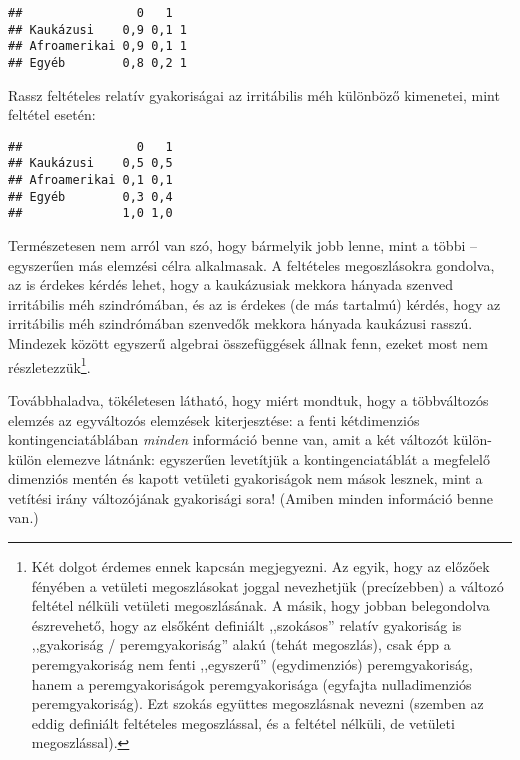\documentclass[]{book}
\newenvironment{Shaded}{\begin{snugshade}}{\end{snugshade}}
\newcommand{\KeywordTok}[1]{\textcolor[rgb]{0.13,0.29,0.53}{\textbf{#1}}}
\newcommand{\DecValTok}[1]{\textcolor[rgb]{0.00,0.00,0.81}{#1}}
\newcommand{\StringTok}[1]{\textcolor[rgb]{0.31,0.60,0.02}{#1}}
\newcommand{\OperatorTok}[1]{\textcolor[rgb]{0.81,0.36,0.00}{\textbf{#1}}}
\newcommand{\NormalTok}[1]{#1}
\let\rmarkdownfootnote\footnote%
\def\footnote{\protect\rmarkdownfootnote}
\begin{document}
\begin{verbatim}
##                0   1  
## Kaukázusi    0,9 0,1 1
## Afroamerikai 0,9 0,1 1
## Egyéb        0,8 0,2 1
\end{verbatim}

Rassz feltételes relatív gyakoriságai az irritábilis méh különböző
kimenetei, mint feltétel esetén:

\begin{Shaded}
\end{Shaded}

\begin{verbatim}
##                0   1
## Kaukázusi    0,5 0,5
## Afroamerikai 0,1 0,1
## Egyéb        0,3 0,4
##              1,0 1,0
\end{verbatim}

Természetesen nem arról van szó, hogy bármelyik jobb lenne, mint a többi
-- egyszerűen más elemzési célra alkalmasak. A feltételes megoszlásokra
gondolva, az is érdekes kérdés lehet, hogy a kaukázusiak mekkora hányada
szenved irritábilis méh szindrómában, és az is érdekes (de más tartalmú)
kérdés, hogy az irritábilis méh szindrómában szenvedők mekkora hányada
kaukázusi rasszú. Mindezek között egyszerű algebrai összefüggések állnak
fenn, ezeket most nem
részletezzük\footnote{Két dolgot érdemes ennek kapcsán megjegyezni. Az egyik, hogy az előzőek fényében a vetületi megoszlásokat joggal nevezhetjük (precízebben) a változó feltétel nélküli vetületi megoszlásának. A másik, hogy jobban belegondolva észrevehető, hogy az elsőként definiált ,,szokásos'' relatív gyakoriság is ,,gyakoriság / peremgyakoriság'' alakú (tehát megoszlás), csak épp a peremgyakoriság nem fenti ,,egyszerű'' (egydimenziós) peremgyakoriság, hanem a peremgyakoriságok peremgyakorisága (egyfajta nulladimenziós peremgyakoriság). Ezt szokás együttes megoszlásnak nevezni (szemben az eddig definiált feltételes megoszlással, és a feltétel nélküli, de vetületi megoszlással).}.

Továbbhaladva, tökéletesen látható, hogy miért mondtuk, hogy a
többváltozós elemzés az egyváltozós elemzések kiterjesztése: a fenti
kétdimenziós kontingenciatáblában \emph{minden} információ benne van,
amit a két változót külön-külön elemezve látnánk: egyszerűen levetítjük
a kontingenciatáblát a megfelelő dimenziós mentén és kapott vetületi
gyakoriságok nem mások lesznek, mint a vetítési irány változójának
gyakorisági sora! (Amiben minden információ benne van.)
\end{document}
